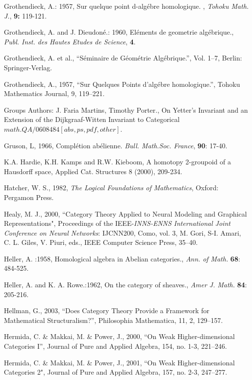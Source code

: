\documentclass[12pt]{article}
\begin{document}
\begin{thebibliography}{399}
Grothendieck, A.: 1957, Sur quelque point d-alg\'{e}bre homologique. , \emph{Tohoku Math. J.}, \textbf{9:} 119-121.

Grothendieck, A. and J. Dieudon\'{e}.: 1960, El\'{e}ments de geometrie alg\'{e}brique., \emph{Publ. Inst. des Hautes Etudes de Science}, \textbf{4}.

Grothendieck, A. et al., ``S\'eminaire de G\'eom\'etrie Alg\'ebrique.'', Vol. 1--7, Berlin: Springer-Verlag.
  
Grothendieck, A., 1957, ``Sur Quelques Points d'alg\'ebre homologique.'', Tohoku Mathematics Journal, 9, 119--221.
  
Groups Authors: J. Faria Martins, Timothy Porter.,
On Yetter's Invariant and an Extension of the Dijkgraaf-Witten Invariant to Categorical
$math.QA/0608484 [abs, ps, pdf, other]$.

Gruson, L, 1966, Compl\'etion ab\'elienne. {\em Bull. Math.Soc. France}, \textbf{90}: 17-40.
 
K.A. Hardie, K.H. Kamps and R.W. Kieboom, A homotopy 2-groupoid of a Hausdorff 
space, Applied Cat. Structures 8 (2000), 209-234.

Hatcher, W. S., 1982, {\em The Logical Foundations of Mathematics}, Oxford: Pergamon Press. 
  
Healy, M. J., 2000, ``Category Theory Applied to Neural Modeling and Graphical Representations", Proceedings of the IEEE-{\em INNS-ENNS International Joint Conference on Neural Networks}: IJCNN200, Como, vol. 3, M. Gori, S-I. Amari, C. L. Giles, V. Piuri, eds., IEEE Computer Science Press, 35--40.  

Heller, A. :1958, Homological algebra in Abelian categories., \emph{Ann. of Math.}
\textbf{68}: 484-525.

Heller, A.  and K. A. Rowe.:1962, On the category of sheaves., \emph{Amer J. Math.}
\textbf{84}: 205-216.

Hellman, G., 2003, ``Does Category Theory Provide a Framework for Mathematical Structuralism?'', Philosophia Mathematica, 11, 2, 129--157. 

Hermida, C. \& Makkai, M. \& Power, J., 2000, ``On Weak Higher-dimensional Categories I'', Journal of Pure and Applied Algebra, 154, no. 1-3, 221--246. 

Hermida, C. \& Makkai, M. \& Power, J., 2001, ``On Weak Higher-dimensional Categories 2", Journal of Pure and Applied Algebra, 157, no. 2-3, 247--277.  


\end{thebibliography}
\end{document}
